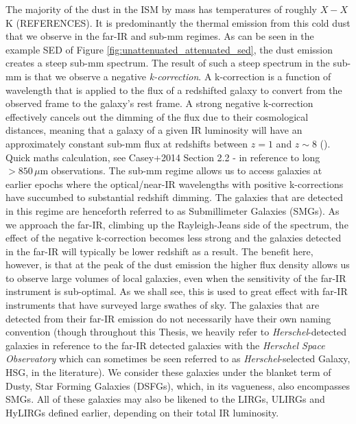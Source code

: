 The majority of the dust in the ISM by mass has temperatures of roughly {\color{red} $X - X\,$K} ({\color{red}REFERENCES}). It is predominantly the thermal emission from this cold dust that we observe in the far-IR and sub-mm regimes. As can be seen in the example SED of Figure \ref{fig:unattenuated_attenuated_sed}, the dust emission creates a steep sub-mm spectrum. The result of such a steep spectrum in the sub-mm is that we observe a negative \textit{k-correction}. A k-correction is a function of wavelength that is applied to the flux of a redshifted galaxy to convert from the observed frame to the galaxy's rest frame. A strong negative k-correction effectively cancels out the dimming of the flux due to their cosmological distances, meaning that a galaxy of a given IR luminosity will have an approximately constant sub-mm flux at redshifts between $z = 1$ and $z\sim8$ (\citealt{Casey_2014b}). {\color{red}Quick maths calculation, see Casey+2014 Section 2.2 - in reference to long $>850\,\mu$m observations}. The sub-mm regime allows us to access galaxies at earlier epochs where the optical/near-IR wavelengths with positive k-corrections have succumbed to substantial redshift dimming. The galaxies that are detected in this regime are henceforth referred to as Submillimeter Galaxies (SMGs). As we approach the far-IR, climbing up the Rayleigh-Jeans side of the spectrum, the effect of the negative k-correction becomes less strong and the galaxies detected in the far-IR will typically be lower redshift as a result. The benefit here, however, is that at the peak of the dust emission the higher flux density allows us to observe large volumes of local galaxies, even when the sensitivity of the far-IR instrument is sub-optimal. As we shall see, this is used to great effect with far-IR instruments that have surveyed large swathes of sky. The galaxies that are detected from their far-IR emission do not necessarily have their own naming convention (though throughout this Thesis, we heavily refer to \textit{Herschel}-detected galaxies in reference to the far-IR detected galaxies with the \textit{Herschel Space Observatory} which can sometimes be seen referred to as \textit{Herschel}-selected Galaxy, HSG, in the literature). We consider these galaxies under the blanket term of Dusty, Star Forming Galaxies (DSFGs), which, in its vagueness, also encompasses SMGs. All of these galaxies may also be likened to the LIRGs, ULIRGs and HyLIRGs defined earlier, depending on their total IR luminosity.

